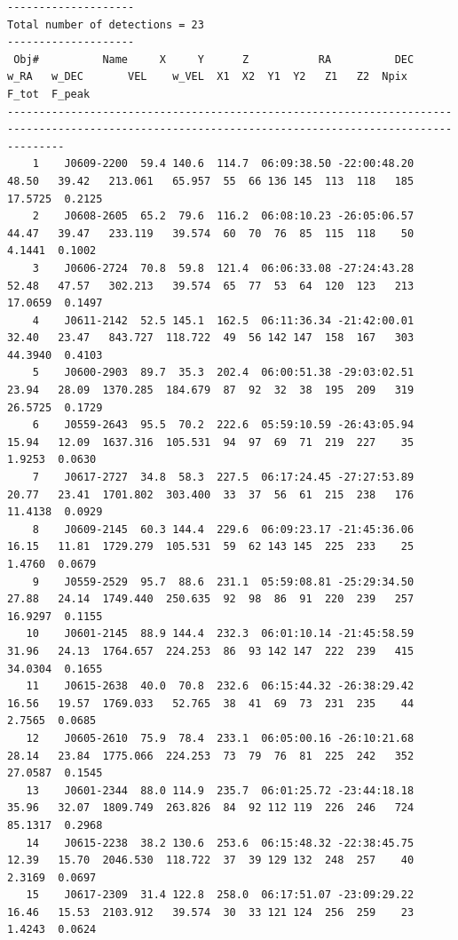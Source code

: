 \documentclass[12pt,a4paper]{article}
\begin{document}
\begin{landscape}
{\begin{verbatim}
--------------------
Total number of detections = 23
--------------------
 Obj#          Name     X     Y      Z           RA          DEC    w_RA   w_DEC       VEL    w_VEL  X1  X2  Y1  Y2   Z1   Z2  Npix     F_tot  F_peak
-----------------------------------------------------------------------------------------------------------------------------------------------------
    1    J0609-2200  59.4 140.6  114.7  06:09:38.50 -22:00:48.20   48.50   39.42   213.061   65.957  55  66 136 145  113  118   185   17.5725  0.2125
    2    J0608-2605  65.2  79.6  116.2  06:08:10.23 -26:05:06.57   44.47   39.47   233.119   39.574  60  70  76  85  115  118    50    4.1441  0.1002
    3    J0606-2724  70.8  59.8  121.4  06:06:33.08 -27:24:43.28   52.48   47.57   302.213   39.574  65  77  53  64  120  123   213   17.0659  0.1497
    4    J0611-2142  52.5 145.1  162.5  06:11:36.34 -21:42:00.01   32.40   23.47   843.727  118.722  49  56 142 147  158  167   303   44.3940  0.4103
    5    J0600-2903  89.7  35.3  202.4  06:00:51.38 -29:03:02.51   23.94   28.09  1370.285  184.679  87  92  32  38  195  209   319   26.5725  0.1729
    6    J0559-2643  95.5  70.2  222.6  05:59:10.59 -26:43:05.94   15.94   12.09  1637.316  105.531  94  97  69  71  219  227    35    1.9253  0.0630
    7    J0617-2727  34.8  58.3  227.5  06:17:24.45 -27:27:53.89   20.77   23.41  1701.802  303.400  33  37  56  61  215  238   176   11.4138  0.0929
    8    J0609-2145  60.3 144.4  229.6  06:09:23.17 -21:45:36.06   16.15   11.81  1729.279  105.531  59  62 143 145  225  233    25    1.4760  0.0679
    9    J0559-2529  95.7  88.6  231.1  05:59:08.81 -25:29:34.50   27.88   24.14  1749.440  250.635  92  98  86  91  220  239   257   16.9297  0.1155
   10    J0601-2145  88.9 144.4  232.3  06:01:10.14 -21:45:58.59   31.96   24.13  1764.657  224.253  86  93 142 147  222  239   415   34.0304  0.1655
   11    J0615-2638  40.0  70.8  232.6  06:15:44.32 -26:38:29.42   16.56   19.57  1769.033   52.765  38  41  69  73  231  235    44    2.7565  0.0685
   12    J0605-2610  75.9  78.4  233.1  06:05:00.16 -26:10:21.68   28.14   23.84  1775.066  224.253  73  79  76  81  225  242   352   27.0587  0.1545
   13    J0601-2344  88.0 114.9  235.7  06:01:25.72 -23:44:18.18   35.96   32.07  1809.749  263.826  84  92 112 119  226  246   724   85.1317  0.2968
   14    J0615-2238  38.2 130.6  253.6  06:15:48.32 -22:38:45.75   12.39   15.70  2046.530  118.722  37  39 129 132  248  257    40    2.3169  0.0697
   15    J0617-2309  31.4 122.8  258.0  06:17:51.07 -23:09:29.22   16.46   15.53  2103.912   39.574  30  33 121 124  256  259    23    1.4243  0.0624

\end{verbatim}}
\end{landscape}
\end{document}
